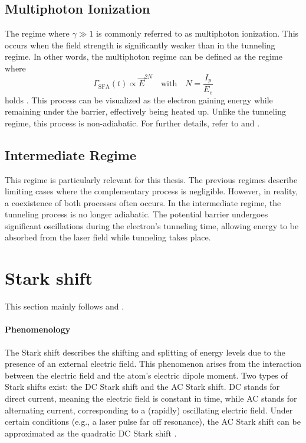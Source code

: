 \subsection{Multiphoton Ionization}
The regime where $\gamma \gg 1$ is commonly referred to as multiphoton ionization.
This occurs when the field strength is significantly weaker than in the tunneling regime.
In other words, the multiphoton regime can be defined as the regime where
\begin{equation*}
    \Gamma_{\mathrm{SFA}}(t) \propto \vec{E}^{2N} \quad \text{with} \quad N = \frac{I_p}{E_e}
\end{equation*}
holds \cite{Ivanov20012005}.
This process can be visualized as the electron gaining energy while remaining under the barrier, effectively being heated up.
Unlike the tunneling regime, this process is non-adiabatic.
For further details, refer to \cite{Ivanov20012005} and \cite{Keldysh:1965ojf}.

\subsection{Intermediate Regime}
This regime is particularly relevant for this thesis.
The previous regimes describe limiting cases where the complementary process is negligible.
However, in reality, a coexistence of both processes often occurs.
In the intermediate regime, the tunneling process is no longer adiabatic.
The potential barrier undergoes significant oscillations during the electron's tunneling time, allowing energy to be absorbed from the laser field while tunneling takes place.







\section{Stark shift}
This section mainly follows \cite{subsycleacstarkshift} and \cite{starkdelonekrainov}.
\paragraph{Phenomenology}
The Stark shift describes the shifting and splitting of energy levels due to the presence of an external electric field.
This phenomenon arises from the interaction between the electric field and the atom's electric dipole moment.
Two types of Stark shifts exist: the DC Stark shift and the AC Stark shift.
DC stands for direct current, meaning the electric field is constant in time, while AC stands for alternating current, corresponding to a (rapidly) oscillating electric field.
Under certain conditions (e.g., a laser pulse far off resonance), the AC Stark shift can be approximated as the quadratic DC Stark shift \cite{starkdelonekrainov}.


